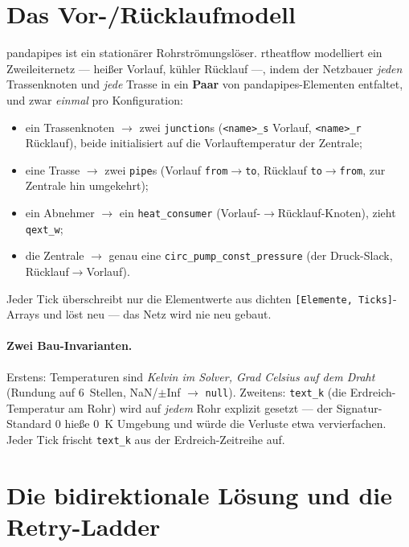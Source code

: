 \documentclass[11pt,a4paper,parskip=half]{scrreprt}
\begin{document}
\section{Das Vor-/Rücklaufmodell}

pandapipes ist ein stationärer Rohrströmungslöser. rtheatflow modelliert ein
Zweileiternetz --- heißer Vorlauf, kühler Rücklauf ---, indem der Netzbauer
\emph{jeden} Trassenknoten und \emph{jede} Trasse in ein \textbf{Paar} von
pandapipes-Elementen entfaltet, und zwar \emph{einmal} pro Konfiguration:

\begin{itemize}[nosep]
  \item ein Trassenknoten $\rightarrow$ zwei \texttt{junction}s
    (\texttt{<name>\_s} Vorlauf, \texttt{<name>\_r} Rücklauf), beide
    initialisiert auf die Vorlauftemperatur der Zentrale;
  \item eine Trasse $\rightarrow$ zwei \texttt{pipe}s (Vorlauf
    \texttt{from}$\rightarrow$\texttt{to}, Rücklauf
    \texttt{to}$\rightarrow$\texttt{from}, zur Zentrale hin umgekehrt);
  \item ein Abnehmer $\rightarrow$ ein \texttt{heat\_consumer}
    (Vorlauf-$\rightarrow$Rücklauf-Knoten), zieht \texttt{qext\_w};
  \item die Zentrale $\rightarrow$ genau eine \texttt{circ\_pump\_const\_pressure}
    (der Druck-Slack, Rücklauf$\rightarrow$Vorlauf).
\end{itemize}

Jeder Tick überschreibt nur die Elementwerte aus dichten
\texttt{[Elemente, Ticks]}-Arrays und löst neu --- das Netz wird nie neu gebaut.

\paragraph{Zwei Bau-Invarianten.} Erstens: Temperaturen sind \emph{Kelvin im
Solver, Grad Celsius auf dem Draht} (Rundung auf 6~Stellen, NaN/$\pm$Inf
$\rightarrow$ \texttt{null}). Zweitens: \texttt{text\_k} (die Erdreich-Temperatur
am Rohr) wird auf \emph{jedem} Rohr explizit gesetzt --- der Signatur-Standard
$0$ hieße 0~K Umgebung und würde die Verluste etwa vervierfachen. Jeder Tick
frischt \texttt{text\_k} aus der Erdreich-Zeitreihe auf.

\section{Die bidirektionale Lösung und die Retry-Ladder}
\end{document}
